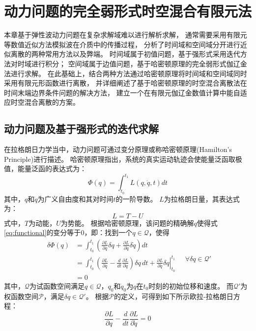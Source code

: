 \chapter{动力问题的完全弱形式时空混合有限元法}\label{ch:1dimension}

本章基于弹性波动力问题在复杂求解域难以进行解析求解，
通常需要采用有限元等数值近似方法模拟波在介质中的传播过程，
分析了时间域和空间域分开进行近似离散的两种常用方法以及弊端。
时间域属于初值问题，基于强形式采用迭代方法对时域进行积分；
空间域属于边值问题，基于哈密顿原理的完全弱形式伽辽金法进行求解。
在此基础上，结合两种方法通过哈密顿原理将时间域和空间域同时采用有限元形函数进行离散，
并详细阐述了基于哈密顿原理的时空混合离散法在时间末端边界条件问题的解决方法，
建立一个在有限元伽辽金数值计算中能自适应时空混合离散的方案。

\section{动力问题及基于强形式的迭代求解}

在拉格朗日力学当中，动力问题可通过变分原理或称哈密顿原理(Hamilton’s Principle)进行描述。
哈密顿原理指出，系统的真实运动轨迹会使能量泛函取极值，能量泛函的表达式为：
\begin{equation}\label{eq:functional}
    \Phi(q) = \int_{t_0}^{t_1} L(q, \dot{q}, t) dt
\end{equation}
其中，$q$和$\dot q$为广义自由度和其对时间$t$的一阶导数。
$L$为拉格朗日量，其表达式为：
\begin{equation}\label{eq:lagrangian}
    L = T - U
\end{equation}
式中，$T$为动能，$U$为势能。
根据哈密顿原理\cite{arnold1978}，该问题的精确解$q$使得式\eqref{eq:functional}的变分等于$0$，即：找到一个$q\in \mathcal{Q}$，使得
\begin{equation}\label{eq:variation}
    \begin{aligned}
        \delta \Phi(q) &= \int_{t_0}^{t_1} \left( \frac{\partial L}{\partial q} \delta q + \frac{\partial L}{\partial \dot{q}} \delta \dot{q} \right) dt \\
        &= \int_{t_0}^{t_1} \left( \frac{\partial L}{\partial q} - \frac{d}{dt} \frac{\partial L}{\partial \dot{q}} \right) \delta q \, dt + \left. \frac{\partial L}{\partial \dot{q}} \delta q \right|_{t_0}^{t_1} \\ &= 0
    \end{aligned}
    \quad \forall \delta q \in \mathcal{Q}'
\end{equation}
其中，$\mathcal{Q}$为试函数空间满足$q\in \mathcal{Q}$，$q_0$和$\dot q_0$为$q$在$t_0$时刻的初始位移和速度。
而$\mathcal{Q}'$为权函数空间$\mathcal{P}$，满足$\delta q\in \mathcal{Q}'$。
根据$\mathcal{P}$的定义，可得到如下所示欧拉-拉格朗日方程：
\begin{equation}\label{eq:euler-lagrange}
    \frac{\partial L}{\partial q} - \frac{d}{dt} \frac{\partial L}{\partial \dot{q}} = 0
\end{equation}


